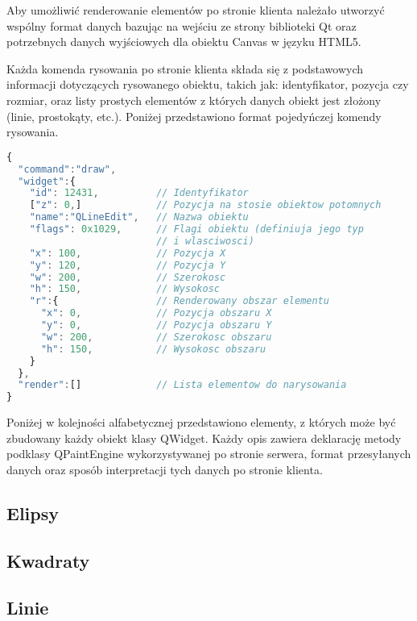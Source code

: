 Aby umożliwić renderowanie elementów po stronie klienta należało utworzyć wspólny format danych bazując na wejściu ze strony biblioteki Qt oraz potrzebnych danych wyjściowych dla obiektu Canvas w języku HTML5. 

Każda komenda rysowania po stronie klienta składa się z podstawowych informacji dotyczących rysowanego obiektu, takich jak: identyfikator, pozycja czy rozmiar, oraz listy prostych elementów z których danych obiekt jest złożony (linie, prostokąty, etc.). Poniżej przedstawiono format pojedyńczej komendy rysowania.


\begin{lstlisting}[language=JavaScript,caption=Komenda renderowania elementu interfejsu]
{
  "command":"draw",
  "widget":{
    "id": 12431,          // Identyfikator
    ["z": 0,]             // Pozycja na stosie obiektow potomnych
    "name":"QLineEdit",   // Nazwa obiektu
    "flags": 0x1029,      // Flagi obiektu (definiuja jego typ 
                          // i wlasciwosci)
    "x": 100,             // Pozycja X
    "y": 120,             // Pozycja Y
    "w": 200,             // Szerokosc
    "h": 150,             // Wysokosc
    "r":{                 // Renderowany obszar elementu
      "x": 0,             // Pozycja obszaru X
      "y": 0,             // Pozycja obszaru Y
      "w": 200,           // Szerokosc obszaru
      "h": 150,           // Wysokosc obszaru
    }
  },
  "render":[]             // Lista elementow do narysowania
}
\end{lstlisting}

Poniżej w kolejności alfabetycznej przedstawiono elementy, z których może być zbudowany każdy obiekt klasy QWidget. Każdy opis zawiera deklarację metody podklasy QPaintEngine wykorzystywanej po stronie serwera, format przesyłanych danych oraz sposób interpretacji tych danych po stronie klienta.

\subsection{Elipsy}


\subsection{Kwadraty}


\subsection{Linie}


